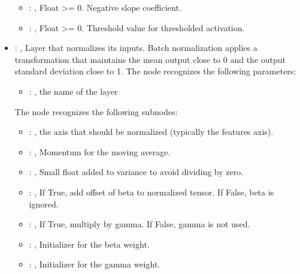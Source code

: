 \begin{itemize}
\begin{itemize}
        \item {}: , 
          Float >= 0. Negative slope coefficient.

        \item {}: , 
          Float >= 0. Threshold value for thresholded activation.
      \end{itemize}

    \item {}: , 
      Layer that normalizes its inputs. Batch normalization applies a transformation that maintains
      the mean output close to 0 and the output standard deviation close to 1.
      The  node recognizes the following parameters:
        \begin{itemize}
          \item {}: , 
            the name of the layer
      \end{itemize}

      The  node recognizes the following subnodes:
      \begin{itemize}
        \item {}: , 
          the axis that should be normalized (typically the features axis).

        \item {}: , 
          Momentum for the moving average.

        \item {}: , 
          Small float added to variance to avoid dividing by zero.

        \item {}: , 
          If True, add offset of beta to normalized tensor. If False, beta is ignored.

        \item {}: , 
          If True, multiply by gamma. If False, gamma is not used.

        \item {}: , 
          Initializer for the beta weight.

        \item {}: , 
          Initializer for the gamma weight.


\end{itemize}
\end{itemize}
